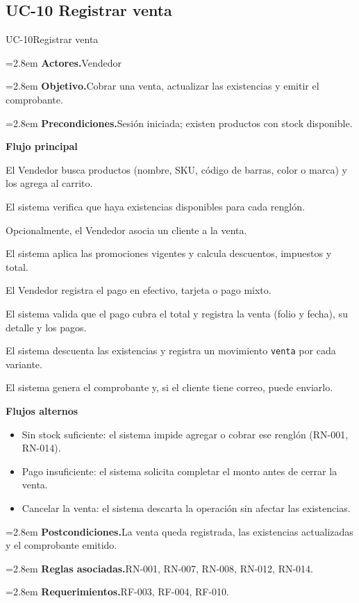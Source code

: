 \documentclass[11pt]{article}
\newcommand{\fila}[2]{\par\smallskip\noindent\hangindent=2.8em\hangafter=0
  \textbf{\sffamily\color{brand!80!black}#1.}\hspace{0.4em}#2\par}
\newcommand{\bloque}[1]{\par\smallskip\noindent\textbf{\sffamily\color{brand!80!black}#1}\par\nopagebreak}
\newenvironment{alternos}{\begin{itemize}[leftmargin=2.9em, itemsep=0.2ex, topsep=0.3ex]}{\end{itemize}}
\begin{document}
\subsection{UC-10 Registrar venta}
\begin{ficha}{UC-10}{Registrar venta}
\fila{Actores}{Vendedor}
\fila{Objetivo}{Cobrar una venta, actualizar las existencias y emitir el comprobante.}
\fila{Precondiciones}{Sesión iniciada; existen productos con stock disponible.}
\bloque{Flujo principal}
\begin{pasos}
  \item El Vendedor busca productos (nombre, SKU, código de barras, color o marca) y los agrega al carrito.
  \item El sistema verifica que haya existencias disponibles para cada renglón.
  \item Opcionalmente, el Vendedor asocia un cliente a la venta.
  \item El sistema aplica las promociones vigentes y calcula descuentos, impuestos y total.
  \item El Vendedor registra el pago en efectivo, tarjeta o pago mixto.
  \item El sistema valida que el pago cubra el total y registra la venta (folio y fecha), su detalle y los pagos.
  \item El sistema descuenta las existencias y registra un movimiento \texttt{venta} por cada variante.
  \item El sistema genera el comprobante y, si el cliente tiene correo, puede enviarlo.
\end{pasos}
\bloque{Flujos alternos}
\begin{alternos}
  \item[\textbf{2a.}] Sin stock suficiente: el sistema impide agregar o cobrar ese renglón (RN-001, RN-014).
  \item[\textbf{5a.}] Pago insuficiente: el sistema solicita completar el monto antes de cerrar la venta.
  \item[\textbf{6a.}] Cancelar la venta: el sistema descarta la operación sin afectar las existencias.
\end{alternos}
\fila{Postcondiciones}{La venta queda registrada, las existencias actualizadas y el comprobante emitido.}
\fila{Reglas asociadas}{RN-001, RN-007, RN-008, RN-012, RN-014.}
\fila{Requerimientos}{RF-003, RF-004, RF-010.}
\end{ficha}
\end{document}
